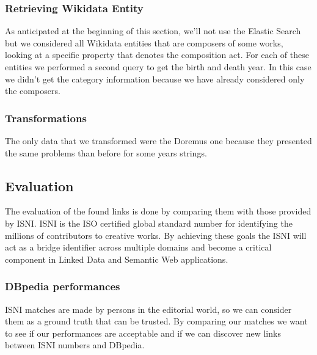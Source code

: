 \documentclass[paper=a4, fontsize=11pt]{scrartcl}
\begin{document}
\subsubsection{Retrieving Wikidata Entity}
As anticipated at the beginning of this section, we'll not use the Elastic Search but we considered all Wikidata entities that are composers of some works, looking at a specific property that denotes the composition act. For each of these entities we performed a second query to get the birth and death year. In this case we didn't get the category information because we have already considered only the composers.

\subsubsection{Transformations}
The only data that we transformed were the Doremus one because they presented the same problems than before for some years strings.
\subsection{Evaluation}
The evaluation of the found links is done by comparing them with those provided by ISNI. ISNI is the ISO certified global standard number for identifying the millions of contributors to creative works. By achieving these goals the ISNI will act as a bridge identifier across multiple domains and become a critical component in Linked Data and Semantic Web applications.

\subsubsection{DBpedia performances}
ISNI matches are made by persons in the editorial world, so we can consider them as a ground truth that can be trusted. By comparing our matches we want to see if our performances are acceptable and if we can discover new links between ISNI numbers and DBpedia.
\end{document}
